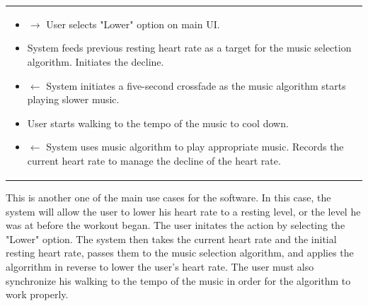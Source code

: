 \documentclass[letterpaper,english, 12pt]{scrreprt}
\begin{document}
\begin{center}
\begin{tabular}{|C{15cm}|}
\begin{flushleft}
                        \end{flushleft}
                                \begin{itemize}
                                        \item $\rightarrow$ User selects "Lower" option on main UI.
                                        \item System feeds previous resting heart rate as a target for the music selection algorithm. Initiates the decline.
                                        \item $\leftarrow$ System initiates a five-second crossfade as the music algorithm starts playing slower music.
                                        \item User starts walking to the tempo of the music to cool down.
                                        \item $\leftarrow$ System uses music algorithm to play appropriate music. Records the current heart rate to manage the decline of the heart rate.
                                \end{itemize}
                \hline
        \end{tabular}
\end{center}

This is another one of the main use cases for the software. In this case, the system will allow the user to lower his heart rate to a resting level, or the level he was at before the workout began. The user initates the action by selecting the "Lower" option. The system then takes the current heart rate and the initial resting heart rate, passes them to the music selection algorithm, and applies the algorrithm in reverse to lower the user's heart rate. The user must also synchronize his walking to the tempo of the music in order for the algorithm to work properly.
\end{document}
